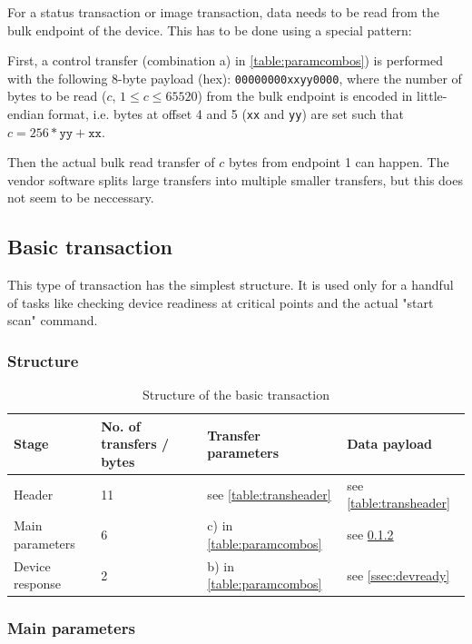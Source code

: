 \documentclass{article}
\begin{document}
For a status transaction or image transaction, data needs to be read from the bulk endpoint of the device.
This has to be done using a special pattern:

First, a control transfer (combination a) in \autoref{table:paramcombos}) is
performed with the following 8-byte payload (hex): {\tt 00000000xxyy0000},
where the number of bytes to be read ($c$, $1 \leq c \leq 65520$) from the bulk endpoint is encoded
in little-endian format, i.e. bytes at offset 4 and 5 ({\tt xx} and {\tt yy}) are set such that
$c = 256 * \texttt{yy} + \texttt{xx}$.

Then the actual bulk read transfer of $c$ bytes from endpoint 1 can happen. The vendor software
splits large transfers into multiple smaller transfers, but this does not seem
to be neccessary.

\subsection{Basic transaction}
\label{ssec:basic_trans}

This type of transaction has the simplest structure. It is used only for a handful of tasks like
checking device readiness at critical points and the actual "start scan" command.

\subsubsection{Structure}

\begin{table}[H]
  \caption{Structure of the basic transaction}
  \centering
  \begin{tabular}{p{3cm} | p{1.5cm} | p{3cm} | p{3cm}}
    Stage & No. of transfers / bytes & Transfer parameters & Data payload \\ \hline
    
    Header & 11 & see \autoref{table:transheader} & see \autoref{table:transheader} \\
    Main parameters & 6 & c) in \autoref{table:paramcombos} & see \ref{ssec:basic_param} \\
    Device response & 2 & b) in \autoref{table:paramcombos} & see \ref{ssec:devready} \\
  \end{tabular}
\end{table}

\subsubsection{Main parameters}
\label{ssec:basic_param}
\end{document}
